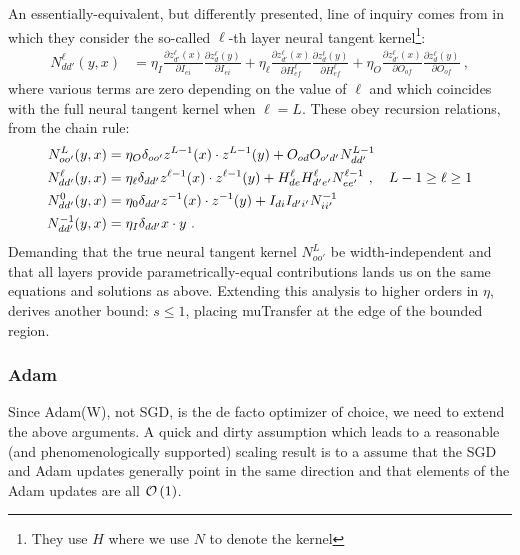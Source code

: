 An essentially-equivalent, but differently presented, line of inquiry comes from
\cite{yaida2022metaprincipledfamilyhyperparameterscaling} in which they consider the so-called $
\ell $-th layer neural tangent kernel\footnote{They use $ H $ where we use $ N $ to denote the
kernel}:
\begin{align}
    N^{ \ell }_{ dd' }(y, x) &= \eta_{ I } \frac{ \partial z ^{ \ell }_{ d' }(x) }{ \partial I_{ ei } }\frac{ \partial z^{ \ell }_{ d }(y) }{ \partial I_{ ei } }
    + \eta_{ \ell }\frac{ \partial z ^{ \ell }_{ d' }(x) }{ \partial H^{ \ell }_{ef} }\frac{ \partial z^{ \ell }_{ d }(y) }{ \partial H^{ \ell }_{ef} }
    + \eta_{ O }\frac{ \partial z ^{ \ell }_{ d' }(x) }{ \partial O_{ of } }\frac{ \partial z^{ \ell }_{ d }(y) }{ \partial O_{of} }\ ,
\end{align}
where various terms are zero depending on the value of $ \ell $ and which coincides with the full
neural tangent kernel when $ \ell=L $. These obey recursion relations, from the chain rule:
\begin{align}
    N^{ L }_{ oo' }(y, x)  &=\eta_{ O }\delta_{ oo' } z^{ L-1 }(x)\cdot z^{ L-1 }(y) + O_{ od }O_{ o'd' }N^{ L-1 }_{ dd' }\nonumber\\
    N^{ \ell }_{ dd' }(y, x)  &=\eta_{ \ell }\delta_{ dd' } z^{ \ell-1 }(x)\cdot z^{ \ell-1 }(y) + H^{ \ell }_{ de }H^{\ell }_{ d'e' }N^{ \ell-1 }_{ ee' } \ , \quad L-1 \ge \ell \ge 1\nonumber\\
    N^{0}_{ dd' }(y, x)  &=\eta_{0}\delta_{ dd' } z^{ -1 }(x)\cdot z^{ -1 }(y) + I_{ di }I_{ d'i' } N^{ -1 }_{ ii' }\nonumber\\
    N^{ -1 }_{ dd' }(y, x)&=\eta_{ I }\delta_{ dd'} x\cdot y \ .
\end{align}
Demanding that the true neural tangent kernel $ N^{ L }_{ oo' } $ be width-independent and that all
layers provide parametrically-equal contributions lands us on the same equations and solutions as
above. Extending this analysis to higher orders in $ \eta $,
\cite{yaida2022metaprincipledfamilyhyperparameterscaling} derives another bound: $ s\le 1 $, placing
muTransfer at the edge of the bounded region.

\subsubsection{Adam}

Since Adam(W), not SGD, is the de facto optimizer of choice, we need to extend the above arguments.
A quick and dirty assumption which leads to a reasonable (and phenomenologically supported) scaling
result is to a assume that the SGD and Adam updates generally point in the same direction and that
elements of the Adam updates are all $ \mathcal{O} \left( 1 \right)  $.

